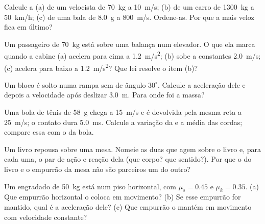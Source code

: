 \begin{exercise}[$\star$]\label{exo:g12:newtons-laws:1}
Calcule a  (a) de um velocista de \qty{70}{kg} a
\qty{10}{m/s}; (b) de um carro de \qty{1300}{kg} a \qty{50}{km/h}; (c) de uma bala de
\qty{8.0}{g} a \qty{800}{m/s}. Ordene-as. Por que a mais veloz fica em último?
\end{exercise}

\begin{exercise}[$\star$]\label{exo:g12:newtons-laws:2}
Um passageiro de \qty{70}{kg} está sobre uma balança num elevador. O que ela marca
quando a cabine (a) acelera para cima a \qty{1.2}{m/s^2}; (b) sobe a constantes
\qty{2.0}{m/s}; (c) acelera para baixo a \qty{1.2}{m/s^2}? Que lei resolve o item (b)?
\end{exercise}

\begin{exercise}[$\star$]\label{exo:g12:newtons-laws:3}
Um bloco é solto numa rampa sem  de ângulo $30^\circ$. Calcule a aceleração dele
e depois a velocidade após deslizar \qty{3.0}{m}. Para onde foi a massa?
\end{exercise}

\begin{exercise}[$\star$]\label{exo:g12:newtons-laws:4}
Uma bola de tênis de \qty{58}{g} chega a \qty{15}{m/s} e é devolvida pela mesma reta a
\qty{25}{m/s}; o contato dura \qty{5.0}{ms}. Calcule a variação da  e a  média das cordas; compare essa  com o  da bola.
\end{exercise}

\begin{exercise}[$\star$]\label{exo:g12:newtons-laws:5}
Um livro repousa sobre uma mesa. Nomeie as duas  que agem sobre o livro e, para
cada uma, o par de ação e reação dela (que corpo? que sentido?). Por que o  do
livro e o empurrão da mesa não são parceiros um do outro?
\end{exercise}

\begin{exercise}[$\star\star$]\label{exo:g12:newtons-laws:6}
Um engradado de \qty{50}{kg} está num piso horizontal, com $\mu_s = 0.45$ e
$\mu_k = 0.35$. (a) Que empurrão horizontal o coloca em movimento? (b) Se esse
empurrão for mantido, qual é a aceleração dele? (c) Que empurrão o mantém em movimento
com velocidade constante?
\end{exercise}

